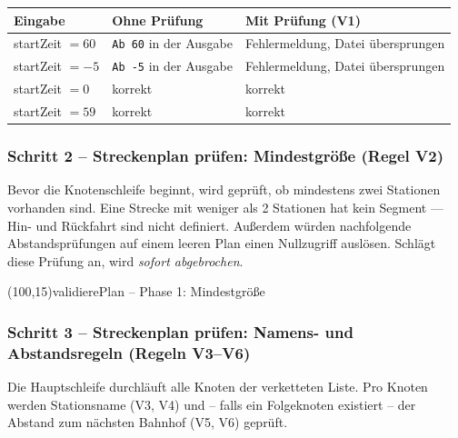 \documentclass[12pt,a4paper]{article}
\begin{document}
\begin{center}
\begin{tabular}{lll}
\toprule
\textbf{Eingabe} & \textbf{Ohne Prüfung} & \textbf{Mit Prüfung (V1)} \\
\midrule
startZeit $= 60$  & \texttt{Ab 60} in der Ausgabe & Fehlermeldung, Datei übersprungen \\
startZeit $= -5$  & \texttt{Ab -5} in der Ausgabe & Fehlermeldung, Datei übersprungen \\
startZeit $= 0$   & korrekt & korrekt \\
startZeit $= 59$  & korrekt & korrekt \\
\bottomrule
\end{tabular}
\end{center}

\subsubsection*{Schritt 2 -- Streckenplan prüfen: Mindestgröße (Regel V2)}

Bevor die Knotenschleife beginnt, wird geprüft, ob mindestens zwei Stationen
vorhanden sind. Eine Strecke mit weniger als 2 Stationen hat kein Segment ---
Hin- und Rückfahrt sind nicht definiert. Außerdem würden nachfolgende
Abstandsprüfungen auf einem leeren Plan einen Nullzugriff auslösen.
Schlägt diese Prüfung an, wird \emph{sofort abgebrochen}.

\begin{center}
\begin{struktogramm}(100,15){validierePlan -- Phase 1: Mindestgröße}
  \change
  \ifend
\end{struktogramm}
\end{center}

\subsubsection*{Schritt 3 -- Streckenplan prüfen: Namens- und Abstandsregeln (Regeln V3--V6)}

Die Hauptschleife durchläuft alle Knoten der verketteten Liste.
Pro Knoten werden Stationsname (V3, V4) und -- falls ein Folgeknoten
existiert -- der Abstand zum nächsten Bahnhof (V5, V6) geprüft.
\end{document}
